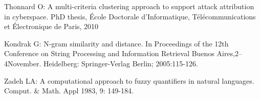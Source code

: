 \documentclass[a4paper]{article}
\begin{document}
\begin{thebibliography}{9}
 Thonnard O: A multi-criteria clustering approach to support attack attribution in cyberspace. PhD thesis, École Doctorale d’Informatique, Télécommunications et Électronique de Paris, 2010

 Kondrak G: N-gram similarity and distance. In Proceedings of the 12th Conference on String Processing and Information Retrieval Buenos Aires,2–4November. Heidelberg: Springer-Verlag Berlin; 2005:115-126. 

 Zadeh LA: A computational approach to fuzzy quantifiers in natural languages. Comput. \& Math. Appl 1983, 9: 149-184.


\end{thebibliography}
\end{document}
